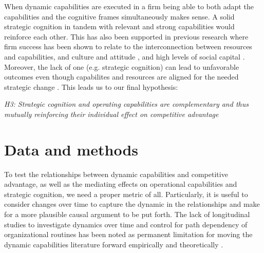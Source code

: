 \documentclass[review,fleqn]{elsarticle}\usepackage[]{graphicx}\usepackage[]{color}
\begin{document}
When dynamic capabilities are executed in a firm being able to both adapt the capabilities
and the cognitive frames simultaneously makes sense. A solid strategic cognition in tandem
with relevant and strong capabilities would reinforce each other. This has also been
supported in previous research where firm success has been shown to relate to the
interconnection between resources and capabilities, and culture and attitude
\citep{Verona2003}, and high levels of social capital \citep{Blyler2003}. Moreover, the
lack of one (e.g. strategic cognition) can lead to unfavorable outcomes even though
capabilites and resources are aligned for the needed strategic change
\citep{Tripsas2000}. This leads us to our final hypothesis:

\emph{H3: Strategic cognition and operating capabilities are complementary and thus
  mutually reinforcing their individual effect on competitive advantage}

\begin{figure}
  \centering
  \captionsetup{width=0.5\linewidth}
  
  \label{fig:fig1}
\end{figure}


\section*{Data and methods}

To test the relationships between dynamic capabilities and competitive advantage, as well
as the mediating effects on operational capabilities and strategic cognition, we need a
proper metric of all. Particularly, it is useful to consider changes over time to capture
the dynamic in the relationships and make for a more plausible causal argument to be put
forth. The lack of longitudinal studies to investigate dynamics over time and control for
path dependency of organizational routines has been noted as permanent limitation for
moving the dynamic capabilities literature forward empirically and theoretically
\citep{Schilke2018}.
\end{document}
